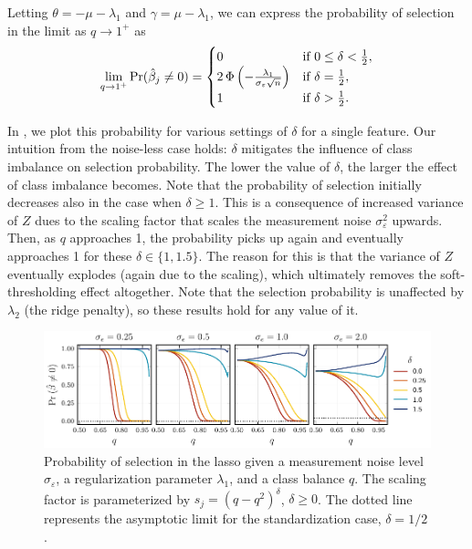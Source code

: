 Letting \(\theta = -\mu - \lambda_1 \) and \(\gamma = \mu - \lambda_1\), we can express the probability of selection in the limit as \(q \rightarrow 1^+\) as
\[
  \lim_{q \rightarrow 1^+} \Pr(\hat{\beta}_j \neq 0) =
  \begin{cases}
    0                                                                & \text{if } 0 \leq \delta < \frac{1}{2}, \\
    2\operatorname{\Phi}\left(-\frac{\lambda_1}{\sigma_\varepsilon \sqrt{n}}\right) & \text{if } \delta = \frac{1}{2},        \\
    1                                                                & \text{if } \delta > \frac{1}{2}.
  \end{cases}
\]

In , we plot this probability for various settings of \(\delta\) for a single feature. Our intuition from the noise-less case holds: \(\delta\) mitigates the influence of class imbalance on selection probability. The lower the value of \(\delta\), the larger the effect of class imbalance becomes. Note that the probability of selection initially decreases also in the case when \(\delta \geq 1\). This is a consequence of increased variance of \(Z\) dues to the scaling factor that scales the measurement noise \(\sigma_\varepsilon^2\) upwards. Then, as \(q\) approaches 1, the probability picks up again and eventually approaches 1 for these \(\delta \in \{1, 1.5\}\). The reason for this is that the variance of \(Z\) eventually explodes (again due to the scaling), which ultimately removes the soft-thresholding effect altogether. Note that the selection probability is unaffected by \(\lambda_2\) (the ridge penalty), so these results hold for any value of it.

\begin{figure}[htpb]
  \centering
  \includegraphics[]{plots/selection_probability.pdf}
  \caption{%
    Probability of selection in the lasso given a measurement noise level \(\sigma_\varepsilon\), a regularization parameter \(\lambda_1\), and a class balance \(q\). The scaling factor is parameterized by \(s_j = (q - q^2)^\delta\), \(\delta \geq 0\). The dotted line represents the asymptotic limit for the standardization case, \(\delta = 1/2\).}
  \label{fig:selection-probability}
\end{figure}

